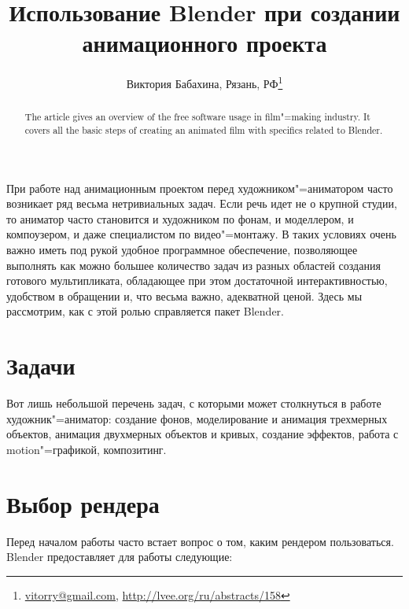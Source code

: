 \documentclass[10pt, a5paper]{article}
\begin{document}
\title{Использование Blender при создании анимационного проекта}
\author{Виктория Бабахина, Рязань, РФ\footnote{\url{vitorry@gmail.com}, \url{http://lvee.org/ru/abstracts/158}}}
\maketitle
\begin{abstract}
The article gives an overview of the free software usage in film"=making industry. It covers all the basic steps of creating an animated film with specifics related to Blender.
\end{abstract}

При работе над анимационным проектом перед художником"=аниматором часто возникает ряд весьма нетривиальных задач. Если речь идет не о крупной студии, то аниматор часто становится и художником по фонам, и моделлером, и компоузером, и даже специалистом по видео"=монтажу. В таких условиях очень важно иметь под рукой удобное программное обеспечение, позволяющее выполнять как можно большее количество задач из разных областей создания готового мультипликата, обладающее при этом достаточной интерактивностью, удобством в обращении и, что весьма важно, адекватной ценой. Здесь мы рассмотрим, как с этой ролью справляется пакет Blender.

\section*{Задачи}

Вот лишь небольшой перечень задач, с которыми может столкнуться в работе художник"=аниматор: создание фонов, моделирование и анимация трехмерных объектов, анимация двухмерных объектов и кривых, создание эффектов,  работа с motion"=графикой, 
композитинг.

\section*{Выбор рендера}

Перед началом работы часто встает вопрос о том, каким рендером пользоваться. Blender предоставляет для работы следующие:
\end{document}
